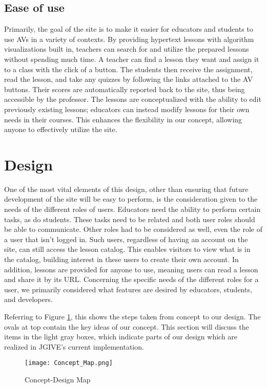 \documentclass{acm_proc_article-sp}
\begin{document}
\subsection{Ease of use}
Primarily, the goal of the site is to make it easier for educators and students to use AVs in a variety of contexts. By providing hypertext lessons with algorithm visualizations built in, teachers can search for and utilize the prepared lessons without spending much time. A teacher can find a lesson they want and assign it to a class with the click of a button.  The students then receive the assignment, read the lesson, and take any quizzes by following the links attached to the AV buttons. Their scores are automatically reported back to the site, thus being accessible by the professor. The lessons are conceptualized with the ability to edit previously existing lessons; educators can instead modify lessons for their own needs in their courses. This enhances the flexibility in our concept, allowing anyone to effectively utilize the site.

\section{Design}
One of the most vital elements of this design, other than ensuring that future development of the site will be easy to perform, is the consideration given to the needs of the different roles of users. Educators need the ability to perform certain tasks, as do students. These tasks need to be related and both user roles should be able to communicate. Other roles had to be considered as well, even the role of a user that isn't logged in. Such users, regardless of having an account on the site, can still access the lesson catalog. This enables visitors to view what is in the catalog, building interest in these users to create their own account. In addition, lessons are provided for anyone to use, meaning users can read a lesson and share it by its URL. Concerning the specific needs of the different roles for a user, we primarily considered what features are desired by educators, students, and developers.

Referring to Figure \ref{fig:Concept Map}, this shows the steps taken from concept to our design. The ovals at top contain the key ideas of our concept. This section will discuss the items in the light gray boxes, which indicate parts of our design which are realized in JGIVE's current implementation.

\begin{figure}[h]
  \begin{center}
    \texttt{[image: Concept\_Map.png]}
  \end{center}
  \caption{Concept-Design Map}
  \label{fig:Concept Map}
\end{figure}
\end{document}
